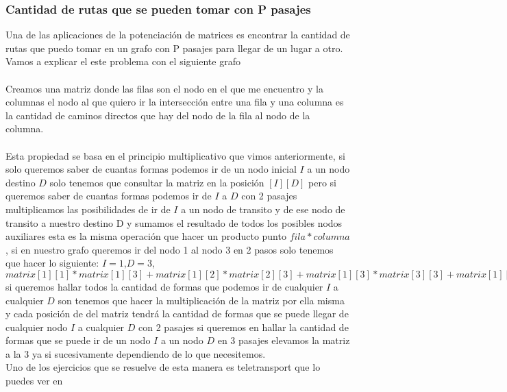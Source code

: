 \subsubsection{Cantidad de rutas que se pueden tomar con P pasajes}
Una de las aplicaciones de la potenciación de matrices es encontrar la cantidad de rutas que puedo
tomar en un grafo con P pasajes para llegar de un lugar a otro.
Vamos a explicar el este problema con el siguiente grafo
\\
\\Creamos una matriz donde las filas son el nodo en el que me encuentro y la columnas el nodo al que quiero ir la intersección entre una fila y una columna es la cantidad de caminos directos que hay del nodo de la fila al nodo de la columna.
\\
\\Esta propiedad se basa en el principio multiplicativo que vimos anteriormente, si solo queremos saber de cuantas formas podemos ir de un nodo inicial $I$ a un nodo destino $D$ solo tenemos que consultar la matriz en la posición $[I][D]$ pero si queremos saber de cuantas formas podemos ir de $I$ a $D$ con 2 pasajes multiplicamos las posibilidades de ir de $I$ a un nodo de transito y de ese nodo de transito a nuestro destino D y sumamos el resultado de todos los posibles nodos auxiliares esta es la misma operación que hacer un producto punto $fila * columna$, si en nuestro grafo queremos ir del nodo 1 al nodo 3 en 2 pasos solo tenemos que hacer lo siguiente:
$I=1$,$D=3$, $matrix[1][1]*matrix[1][3]+matrix[1][2]*matrix[2][3]+matrix[1][3]*matrix[3][3]+matrix[1][4]*matrix[4][3]+matrix[1][5]*matrix[5][3]$
si queremos hallar todos la cantidad de formas que podemos ir de cualquier $I$ a cualquier $D$ son tenemos que hacer la multiplicación  de la matriz por ella misma y cada posición de del matriz tendrá la cantidad de formas que se puede llegar de cualquier nodo $I$ a cualquier $D$ con 2 pasajes
si queremos en hallar la cantidad de formas que se puede ir de un nodo $I$ a un nodo $D$ en 3 pasajes elevamos la matriz a la 3 ya si sucesivamente dependiendo de lo que necesitemos.
\\Uno de los ejercicios que se resuelve de esta manera es teletransport que lo puedes ver en \cite{Teletransport:Online}
